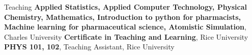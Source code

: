 \begin{rubric}{Teaching}
%
%
  \textbf{Applied Statistics, Applied Computer Technology, Physical Chemistry, Mathematics, Introduction to python for pharmacists, Machine learning for pharmaceutical science, Atomistic Simulation}, Charles University
\entry*[\hspace{1.05cm}2020]%
  \textbf{Certificate in Teaching and Learning}, Rice University
\entry*[2015 -- 2016]%
  \textbf{PHYS 101, 102}, Teaching Assistant, Rice University
\end{rubric}
